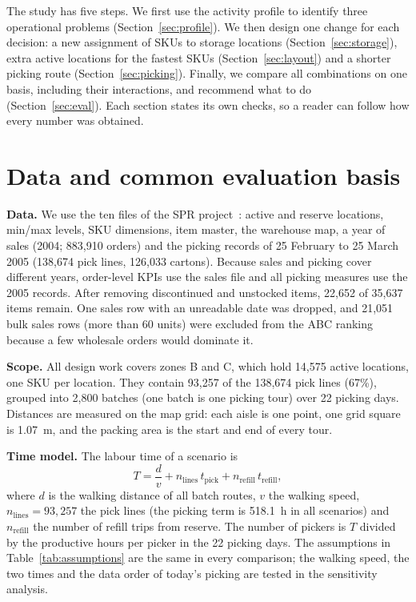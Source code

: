 \documentclass[conference]{IEEEtran}
\begin{document}
The study has five steps. We first use the activity profile to identify three operational problems (Section~\ref{sec:profile}). We then design one change for each decision: a new assignment of SKUs to storage locations (Section~\ref{sec:storage}), extra active locations for the fastest SKUs (Section~\ref{sec:layout}) and a shorter picking route (Section~\ref{sec:picking}). Finally, we compare all combinations on one basis, including their interactions, and recommend what to do (Section~\ref{sec:eval}). Each section states its own checks, so a reader can follow how every number was obtained.

\section{Data and common evaluation basis}\label{sec:data}
\textbf{Data.} We use the ten files of the SPR project~\cite{spr}: active and reserve locations, min/max levels, SKU dimensions, item master, the warehouse map, a year of sales (2004; 883,910 orders) and the picking records of 25 February to 25 March 2005 (138,674 pick lines, 126,033 cartons). Because sales and picking cover different years, order-level KPIs use the sales file and all picking measures use the 2005 records. After removing discontinued and unstocked items, 22,652 of 35,637 items remain. One sales row with an unreadable date was dropped, and 21,051 bulk sales rows (more than 60 units) were excluded from the ABC ranking because a few wholesale orders would dominate it.

\textbf{Scope.} All design work covers zones B and C, which hold 14,575 active locations, one SKU per location. They contain 93,257 of the 138,674 pick lines (67\%), grouped into 2,800 batches (one batch is one picking tour) over 22 picking days. Distances are measured on the map grid: each aisle is one point, one grid square is 1.07~m, and the packing area is the start and end of every tour.

\textbf{Time model.} The labour time of a scenario is
\begin{equation}
T = \frac{d}{v} + n_{\text{lines}}\, t_{\text{pick}} + n_{\text{refill}}\, t_{\text{refill}},
\end{equation}
where $d$ is the walking distance of all batch routes, $v$ the walking speed, $n_{\text{lines}}=93{,}257$ the pick lines (the picking term is 518.1~h in all scenarios) and $n_{\text{refill}}$ the number of refill trips from reserve. The number of pickers is $T$ divided by the productive hours per picker in the 22 picking days. The assumptions in Table~\ref{tab:assumptions} are the same in every comparison; the walking speed, the two times and the data order of today's picking are tested in the sensitivity analysis.
\end{document}
